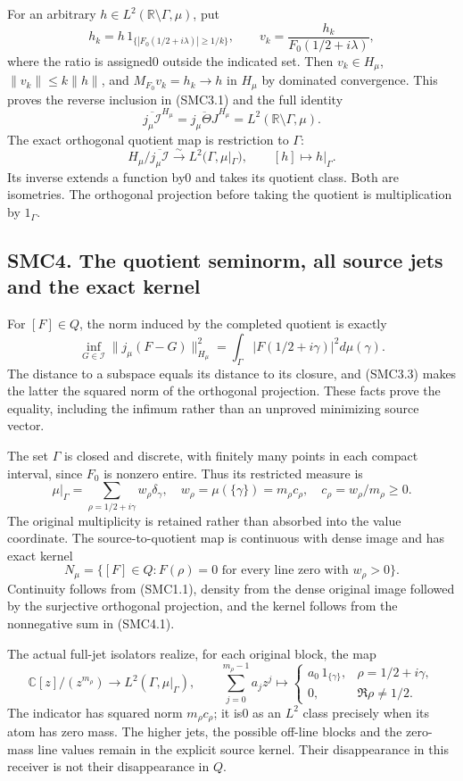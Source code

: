 For an arbitrary \(h\in L^2(\mathbb R\setminus\Gamma,\mu)\), put \[
h_k=h\,1_{\{|F_0(1/2+i\lambda)|\ge1/k\}},\qquad
v_k=\frac{h_k}{F_0(1/2+i\lambda)},
\tag{SMC3.2}
\] where the ratio is assigned0 outside the indicated set. Then
\(v_k\in H_\mu\), \(\|v_k\|\le k\|h\|\), and \(M_{F_0}v_k=h_k\to h\) in
\(H_\mu\) by dominated convergence. This proves the reverse inclusion in
(SMC3.1) and the full identity \[
\boxed{\overline{j_\mu\mathcal I}^{H_\mu}
=\overline{j_\mu\Theta J}^{H_\mu}
=L^2(\mathbb R\setminus\Gamma,\mu).}
\tag{SMC3.3}
\] The exact orthogonal quotient map is restriction to \(\Gamma\): \[
H_\mu/\overline{j_\mu\mathcal I}
\xrightarrow{\sim}L^2(\Gamma,\mu|_\Gamma),
\qquad[h]\longmapsto h|_\Gamma.
\tag{SMC3.4}
\] Its inverse extends a function by0 and takes its quotient class. Both
are isometries. The orthogonal projection before taking the quotient is
multiplication by \(1_\Gamma\).

\subsection{SMC4. The quotient seminorm, all source jets and the exact
kernel}\label{smc4.-the-quotient-seminorm-all-source-jets-and-the-exact-kernel}

For \([F]\in Q\), the norm induced by the completed quotient is exactly
\[
\boxed{\inf_{G\in\mathcal I}\|j_\mu(F-G)\|_{H_\mu}^2
=\int_\Gamma|F(1/2+i\gamma)|^2d\mu(\gamma).}
\tag{SMC4.1}
\] The distance to a subspace equals its distance to its closure, and
(SMC3.3) makes the latter the squared norm of the orthogonal projection.
These facts prove the equality, including the infimum rather than an
unproved minimizing source vector.

The set \(\Gamma\) is closed and discrete, with finitely many points in
each compact interval, since \(F_0\) is nonzero entire. Thus its
restricted measure is \[
\mu|_\Gamma=\sum_{\rho=1/2+i\gamma}w_\rho\delta_\gamma,
\quad w_\rho=\mu(\{\gamma\})=m_\rho c_\rho,
\quad c_\rho=w_\rho/m_\rho\ge0.
\tag{SMC4.2}
\] The original multiplicity is retained rather than absorbed into the
value coordinate. The source-to-quotient map is continuous with dense
image and has exact kernel \[
N_\mu=\{[F]\in Q:F(\rho)=0
\text{ for every line zero with }w_\rho>0\}.
\tag{SMC4.3}
\] Continuity follows from (SMC1.1), density from the dense original
image followed by the surjective orthogonal projection, and the kernel
follows from the nonnegative sum in (SMC4.1).

The actual full-jet isolators realize, for each original block, the map
\[
\mathbb C[z]/(z^{m_\rho})\longrightarrow L^2(\Gamma,\mu|_\Gamma),
\qquad \sum_{j=0}^{m_\rho-1}a_jz^j\longmapsto
\begin{cases}
a_0\,1_{\{\gamma\}},&\rho=1/2+i\gamma,\\
0,&\Re\rho\ne1/2.
\end{cases}
\tag{SMC4.4}
\] The indicator has squared norm \(m_\rho c_\rho\); it is0 as an
\(L^2\) class precisely when its atom has zero mass. The higher jets,
the possible off-line blocks and the zero-mass line values remain in the
explicit source kernel. Their disappearance in this receiver is not
their disappearance in \(Q\).

